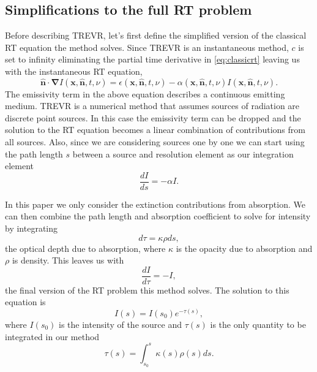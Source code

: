 \documentclass[fleq,usenatbib]{mnras}
\newcommand{\acro}{TREVR}
\begin{document}
\subsection{Simplifications to the full RT problem}
Before describing \acro{}, let's first define the 
simplified version of the classical RT equation the method solves. Since 
\acro{} is an instantaneous method, $c$ is set to infinity eliminating the 
partial time derivative in \ref{eq:classicrt} leaving us with the 
instantaneous RT equation,
\begin{equation} \label{infcrt}
\mathbf{\hat{n} \cdot \nabla} I\left(\mathbf{x}, \mathbf{\hat{n}}, t, 
\nu\right) = \epsilon\left(\mathbf{x}, \mathbf{\hat{n}}, t, \nu\right) - 
\alpha\left(\mathbf{x}, \mathbf{\hat{n}}, t, \nu\right) 
I\left(\mathbf{x}, \mathbf{\hat{n}}, t, \nu\right).
\end{equation}
The emissivity term in the above equation describes a continuous emitting 
medium. \acro{} is a numerical method that assumes sources of radiation are 
discrete point sources. In this case the emissivity term can be dropped and 
the solution to the RT equation becomes a linear combination of contributions 
from all sources. Also, since we are considering sources one by one we can 
start using the path length $s$ between a source and resolution element as our 
integration element
\begin{equation}
\label{eq:combtransfer}
\frac{dI}{ds} = -\alpha I.
\end{equation}

In this paper we only consider the extinction contributions from 
absorption. We can then combine the path length and absorption coefficient to 
solve for intensity by integrating 
\begin{equation}
\label{eq:dtau}
d\tau = \kappa \rho ds, 
\end{equation}
the optical depth due to absorption, where $\kappa$ is the opacity due to 
absorption and $\rho$ is density. This leaves us with
\begin{equation}
\label{eq:absorbtransfer}
\frac{dI}{d\tau} = -I,
\end{equation}
the final version of the RT problem this method solves. The solution to this 
equation is 
\begin{equation}
\label{eq:ient}
I(s) = I(s_0)e^{-\tau(s)},
\end{equation}
where $I(s_0)$ is the intensity of the source and $\tau(s)$ is the only
quantity to be integrated in our method
\begin{equation}
\label{eq:tauint}
\tau(s) = \int_{s_0}^s \kappa(s) \rho(s) ds.
\end{equation}
\end{document}
